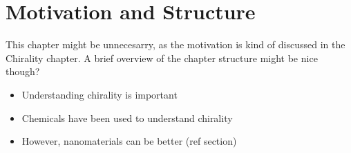 \chapter{Motivation and Structure}\label{sec:background:Introduction}
\color{red}
This chapter might be unnecesarry, as the motivation is kind of discussed in the Chirality chapter. A brief overview of the chapter structure might be nice though?
\color{black}

\begin{itemize}
    \item Understanding chirality is important
    \item Chemicals have been used to understand chirality
    \item However, nanomaterials can be better (ref section)
\end{itemize}